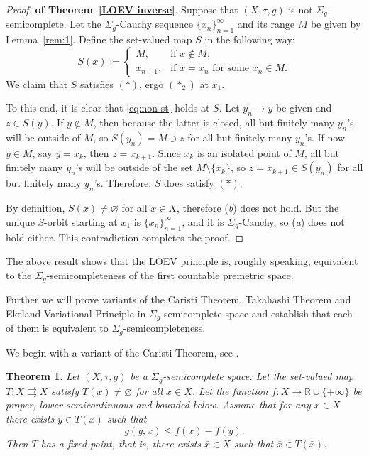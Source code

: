 \documentclass[12pt]{article}
\newtheorem{theorem}{Theorem}[section]
\newcommand{\astwo}{(\ast_2)}
\newcommand{\R}{\mathbb{R}}
\begin{document}
\begin{proof} \textbf{of Theorem~\ref{LOEV inverse}}. Suppose that $(X,\tau,g)$ is not  $\Sigma_g$-semicomplete. Let the $\Sigma_g$-Cauchy sequence $\{x_n\}_{n=1}^\infty$ and its range $M$ be given by Lemma~\ref{rem:1}. Define the set-valued map  $S$ in the following way:
\begin{equation}
    \label{eq:S-M-def}
    S(x):= \left \{\begin{array}{rl} M, & \text{if } x \notin M;  \\
x_{n+1} ,& \text{if } x = x_{n} \text{ for some } x_{n}  \in M. \end{array} \right.
\end{equation}
We claim that $S$ satisfies $(\ast)$, ergo $\astwo$ at $x_1$.

To this end, it is clear that \eqref{eq:non-st} holds at $S$. Let $y_n\to y$ be given and $z\in S(y)$. If $y\not\in M$, then because the latter is closed, all but finitely many $y_n$'s will be outside of $M$, so $S(y_n) = M\ni z$ for all but finitely many $y_n$'s. If now $y\in M$, say $y = x_k$, then $z=x_{k+1}$. Since $x_k$ is an isolated point of $M$, all but finitely many $y_n$'s will be outside of the set $M\setminus\{x_k\}$, so $z=x_{k+1}\in S(y_n)$ for all but finitely many $y_n$'s. Therefore, $S$ does satisfy $(\ast)$.

By definition, $S(x) \neq \varnothing$ for all $x \in X$, therefore (\emph{b}) does not hold. But  the unique $S$-orbit starting at $x_1$ is $\{x_n\}_{n=1}^\infty$, and it is $\Sigma_g$-Cauchy, so (\emph{a}) does not hold either. This contradiction completes the proof.
\end{proof}

The above result shows that the LOEV principle is, roughly speaking, equivalent to the
 $\Sigma_g$-semicompleteness of the first countable premetric space.

 Further we will prove variants of the Caristi Theorem, Takahashi Theorem and Ekeland Variational Principle in  $\Sigma_g$-semicomplete space and establish that each of them is equivalent to $\Sigma_g$-semicompleteness.

 We begin with a variant of the Caristi Theorem, see \cite{Caristi}.

\begin{theorem} \label{th:Caristi}
Let $(X,\tau,g)$ be a   $\Sigma_g$-semicomplete space. Let the set-valued map $T:X \rightrightarrows X$ satisfy $T(x) \neq \varnothing$ for all $x \in X$. Let the function $f: X \rightarrow \R \cup \{+\infty\}$ be proper, lower semicontinuous and bounded below. Assume that for any $x \in X$ there exists $y \in T(x)$ such that
\begin{equation}\label{CK_condition}
g(y,x) \leq f(x)-f(y). 
\end{equation}
Then $T$ has a fixed point, that is, there exists $\bar{x}\in X$ such that $\bar{x} \in T(\bar{x})$.
\end{theorem}
\end{document}
